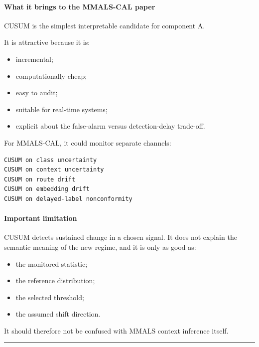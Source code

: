 \paragraph{What it brings to the MMALS-CAL paper}\label{what-it-brings-to-the-mmals-cal-paper-7}

CUSUM is the simplest interpretable candidate for component A.

It is attractive because it is:

\begin{itemize}
\tightlist
\item
  incremental;
\item
  computationally cheap;
\item
  easy to audit;
\item
  suitable for real-time systems;
\item
  explicit about the false-alarm versus detection-delay trade-off.
\end{itemize}

For MMALS-CAL, it could monitor separate channels:

\begin{lstlisting}
CUSUM on class uncertainty
CUSUM on context uncertainty
CUSUM on route drift
CUSUM on embedding drift
CUSUM on delayed-label nonconformity
\end{lstlisting}

\paragraph{Important limitation}\label{important-limitation-3}

CUSUM detects sustained change in a chosen signal. It does not explain the semantic meaning of the new regime, and it is only as good as:

\begin{itemize}
\tightlist
\item
  the monitored statistic;
\item
  the reference distribution;
\item
  the selected threshold;
\item
  the assumed shift direction.
\end{itemize}

It should therefore not be confused with MMALS context inference itself.

\begin{center}\rule{0.5\linewidth}{0.5pt}\end{center}

